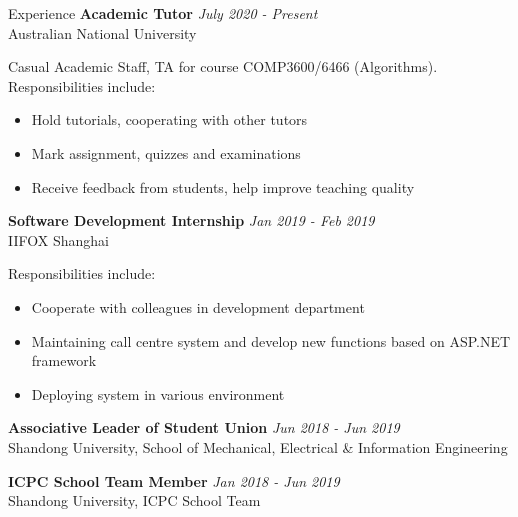 \documentclass{resume} %
\begin{document}
\begin{rSection}{Experience}
{\bf Academic Tutor} \hfill {\em July 2020 - Present}\\
{Australian National University}

Casual Academic Staff, TA for course COMP3600/6466 (Algorithms). Responsibilities include:
\begin{itemize}
	\item Hold tutorials, cooperating with other tutors
	\item Mark assignment, quizzes and examinations
	\item Receive feedback from students, help improve teaching quality
\end{itemize}


{\bf Software Development Internship} \hfill {\em Jan 2019 - Feb 2019}\\
{IIFOX Shanghai}

Responsibilities include:
\begin{itemize}
	\item Cooperate with colleagues in development department
	\item Maintaining call centre system and develop new functions based on ASP.NET framework
	\item Deploying system in various environment
\end{itemize}
 
{\bf Associative Leader of Student Union} \hfill {\em Jun 2018 - Jun 2019}\\
{Shandong University, School of Mechanical, Electrical \& Information Engineering}

{\bf ICPC School Team Member} \hfill {\em Jan 2018 - Jun 2019}\\
{Shandong University, ICPC School Team}

\end{rSection}
\end{document}
